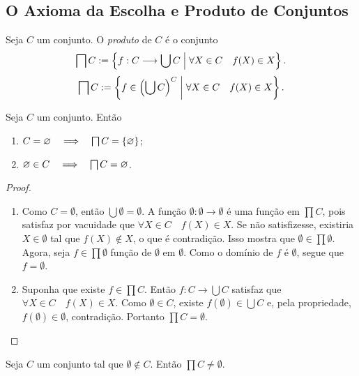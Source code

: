 \subsection*{O Axioma da Escolha e Produto de Conjuntos}

\begin{defi}
Seja $C$ um conjunto. O \emph{produto} de $C$ é o conjunto
	\begin{equation*}
	\prod C := \set{f: C \to \bigcup C }{\forall X \in C \quad f(X) \in X}.
	\end{equation*}
	\begin{equation*}
	\prod C := \set{f \in \left(\bigcup C\right)^C }{\forall X \in C \quad f(X) \in X}.
	\end{equation*}
\end{defi}

\begin{prop}
Seja $C$ um conjunto. Então
	\begin{enumerate}
	\item $C = \emptyset \entao \prod C = \{\emptyset\}$;
	\item $\emptyset \in C \entao \prod C = \emptyset$.
	\end{enumerate}
\end{prop}
\begin{proof}
	\begin{enumerate}
	\item Como $C=\emptyset$, então $\bigcup \emptyset = \emptyset$. A função $\emptyset: \emptyset \to \emptyset$ é uma função em $\prod C$, pois satisfaz por vacuidade que $\forall X \in C \quad f(X) \in X$. Se não satisfizesse, existiria $X \in \emptyset$ tal que $f(X) \notin X$, o que é contradição. Isso mostra que $\emptyset \in \prod \emptyset$. Agora, seja $f \in \prod \emptyset$ função de $\emptyset$ em $\emptyset$. Como o domínio de $f$ é $\emptyset$, segue que $f=\emptyset$.
	
	\item Suponha que existe $f \in \prod C$. Então $f: C \to \bigcup C$ satisfaz que $\forall X \in C \quad f(X) \in X$. Como $\emptyset \in C$, existe $f(\emptyset) \in \bigcup C$ e, pela propriedade, $f(\emptyset) \in \emptyset$, contradição. Portanto $\prod C = \emptyset$.
	\end{enumerate}
\end{proof}

\begin{axi}[Escolha]
Seja $C$ um conjunto tal que $\emptyset \notin C$. Então $\prod C \neq \emptyset$.
\end{axi}



